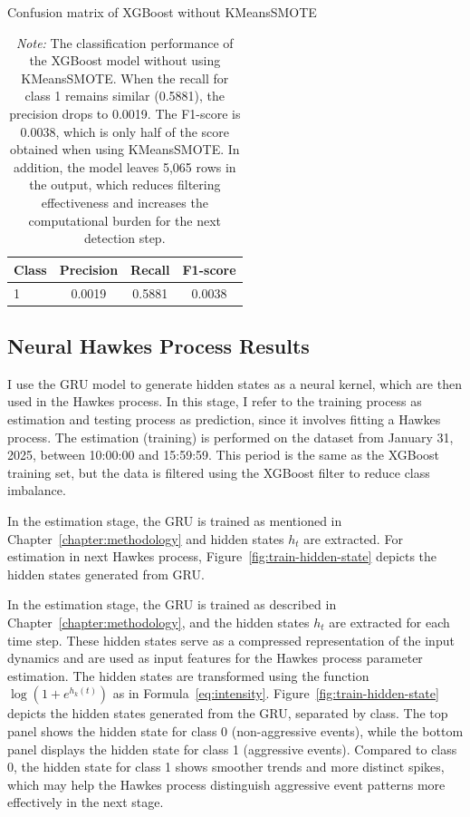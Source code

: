 \begin{table}[htbp]
    \centering
    \caption{Confusion matrix of XGBoost without KMeansSMOTE}
    \caption*{\textit{Note:} The classification performance of the XGBoost model without using KMeansSMOTE. When the recall for class 1 remains similar (0.5881), the precision drops to 0.0019. The F1-score is 0.0038, which is only half of the score obtained when using KMeansSMOTE. In addition, the model leaves 5,065 rows in the output, which reduces filtering effectiveness and increases the computational burden for the next detection step.}
    \label{tab:xgb-noKM}
    \begin{tabular}{lccc}
        \toprule
        Class & Precision & Recall & F1-score\\
        \midrule
        1 & 0.0019 & 0.5881 & 0.0038 \\        
        \bottomrule
    \end{tabular}
\end{table}



\newpage

\subsection{Neural Hawkes Process Results}
I use the GRU model to generate hidden states as a neural kernel, which are then used in the Hawkes process. In this stage, I refer to the training process as estimation and testing process as prediction, since it involves fitting a Hawkes process. The estimation (training) is performed on the dataset from January 31, 2025, between 10:00:00 and 15:59:59. This period is the same as the XGBoost training set, but the data is filtered using the XGBoost filter to reduce class imbalance.

In the estimation stage, the GRU is trained as mentioned in Chapter~\ref{chapter:methodology} and hidden states $h_t$ are extracted. For estimation in next Hawkes process, Figure~\ref{fig:train-hidden-state} depicts the hidden states generated from GRU.

In the estimation stage, the GRU is trained as described in Chapter~\ref{chapter:methodology}, and the hidden states $h_t$ are extracted for each time step. These hidden states serve as a compressed representation of the input dynamics and are used as input features for the Hawkes process parameter estimation. The hidden states are transformed using the function $\log(1 + e^{h_k(t)})$ as in Formula~\ref{eq:intensity}. Figure~\ref{fig:train-hidden-state} depicts the hidden states generated from the GRU, separated by class. The top panel shows the hidden state for class 0 (non-aggressive events), while the bottom panel displays the hidden state for class 1 (aggressive events). Compared to class 0, the hidden state for class 1 shows smoother trends and more distinct spikes, which may help the Hawkes process distinguish aggressive event patterns more effectively in the next stage.

